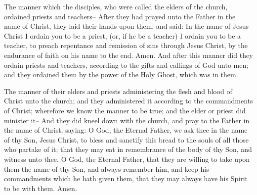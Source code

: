 \bchapter
\bverse \iffalse The manner which the disciples, who were called the elders of the church, ordained priests and teachers-- \fi
The manner which the disciples, who were called the elders of the church, ordained priests and teachers--
\bverse \iffalse After they had prayed unto the Father in the name of Christ, they laid their hands upon them, and said: \fi
After they had prayed unto the Father in the name of Christ, they laid their hands upon them, and said:
\bverse \iffalse In the name of Jesus Christ I ordain you to be a priest, (or, if he be a teacher) I ordain you to be a teacher, to preach repentance and remission of sins through Jesus Christ, by the endurance of faith on his name to the end. Amen. \fi
In the name of Jesus Christ I ordain you to be a priest, (or, if he be a teacher) I ordain you to be a teacher, to preach repentance and remission of sins through Jesus Christ, by the endurance of faith on his name to the end. Amen.
\bverse \iffalse And after this manner did they ordain priests and teachers, according to the gifts and callings of God unto men; and they ordained them by the power of the Holy Ghost, which was in them. \fi
And after this manner did they ordain priests and teachers, according to the gifts and callings of God unto men; and they ordained them by the power of the Holy Ghost, which was in them.

\bchapter
\bverse \iffalse The manner of their elders and priests administering the flesh and blood of Christ unto the church; and they administered it according to the commandments of Christ; wherefore we know the manner to be true; and the elder or priest did minister it-- \fi
The manner of their elders and priests administering the flesh and blood of Christ unto the church; and they administered it according to the commandments of Christ; wherefore we know the manner to be true; and the elder or priest did minister it--
\bverse \iffalse And they did kneel down with the church, and pray to the Father in the name of Christ, saying: \fi
And they did kneel down with the church, and pray to the Father in the name of Christ, saying:
\bverse \iffalse O God, the Eternal Father, we ask thee in the name of thy Son, Jesus Christ, to bless and sanctify this bread to the souls of all those who partake of it; that they may eat in remembrance of the body of thy Son, and witness unto thee, O God, the Eternal Father, that they are willing to take upon them the name of thy Son, and always remember him, and keep his commandments which he hath given them, that they may always have his Spirit to be with them. Amen. \fi
O God, the Eternal Father, we ask thee in the name of thy Son, Jesus Christ, to bless and sanctify this bread to the souls of all those who partake of it; that they may eat in remembrance of the body of thy Son, and witness unto thee, O God, the Eternal Father, that they are willing to take upon them the name of thy Son, and always remember him, and keep his commandments which he hath given them, that they may always have his Spirit to be with them. Amen.

